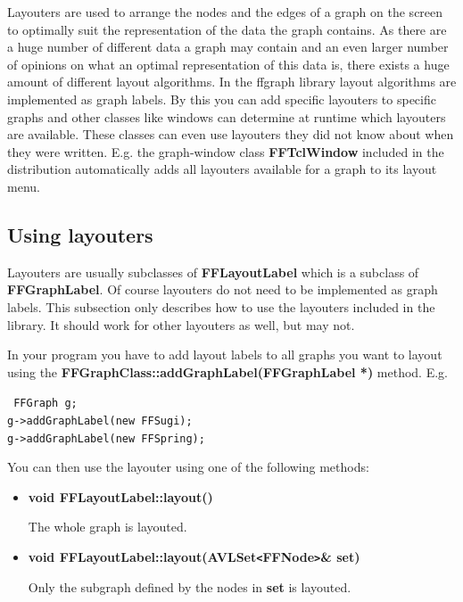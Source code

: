 
Layouters are used to arrange the nodes and the edges of a graph
on the screen to optimally suit the representation of the
data the graph contains. As there are a huge number of
different data a graph may contain and an even larger number of
opinions on what an optimal representation of this data is, there
exists a huge amount of different layout algorithms. In the
ffgraph library layout algorithms are implemented as graph
labels. By this you can add specific layouters to specific graphs
and other classes like windows can determine at runtime which
layouters are available. These classes can even use layouters
they did not know about when they were written. E.g. the
graph-window class {\bf FFTclWindow} included in the distribution
automatically adds all layouters available for a graph to its
layout menu.

\subsection{Using layouters} 
\label{using_layouters}

Layouters are usually subclasses of {\bf FFLayoutLabel} which is
a subclass of {\bf FFGraphLabel}. Of course layouters do not need
to be implemented as graph labels.  This subsection only
describes how to use the layouters included in the library. It
should work for other layouters as well, but may not.

In your program you have to add layout labels to all graphs you
want to layout using the {\bf
  FFGraphClass::addGraphLabel(FFGraphLabel *)} method.  E.g.

\bigskip

{\tt  
FFGraph g;\\
g->addGraphLabel(new FFSugi);\\
g->addGraphLabel(new FFSpring);\\
}

\bigskip

You can then use the layouter using one of the following methods:

\begin{itemize}

\item{\bf void FFLayoutLabel::layout()}

The whole graph is layouted.

\item{\bf void FFLayoutLabel::layout(AVLSet\verb|<|FFNode\verb|>|\& set)}

Only the subgraph defined by the nodes in {\bf set} is layouted.

\end{itemize}

